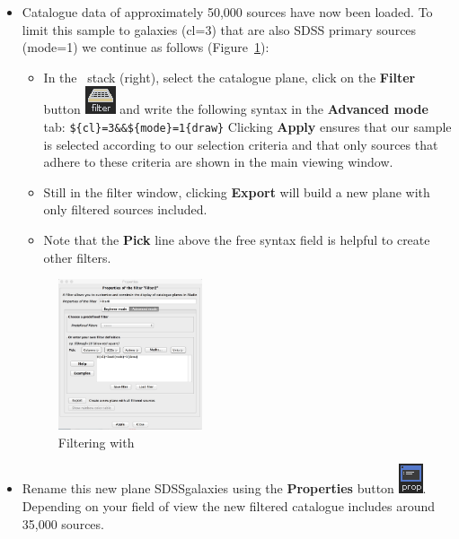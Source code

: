 \documentclass [a4paper, 12pt]{article}
\begin{document}
\begin{itemize}
\item Catalogue data of approximately 50,000 sources have now been loaded. To
limit this sample to galaxies (cl=3) that are also SDSS primary sources
(mode=1) we continue as follows (Figure~\ref{fig:aladinfilter}):
\begin{itemize}
    \item In the \aladin\ stack (right), select the catalogue plane, click on
    the \textbf{Filter} button  \includegraphics[width=0.04
    \textwidth]{../images/aladin_button_filter.png} and write the following
    syntax in the \textbf{Advanced mode} tab: \newline
    \texttt{\$\{cl\}=3\&\&\$\{mode\}=1\{draw\}} \newline
    Clicking \textbf{Apply} ensures that our sample is selected according to
    our selection criteria and that only sources that adhere to these criteria
    are shown in the main viewing window.
    \item Still in the filter window, clicking \textbf{Export} will build a new
    plane with only filtered sources included.
    \item Note that the \textbf{Pick} line above the free syntax field is
    helpful to create other filters.
\end{itemize}

\begin{figure}[H]
\center
\includegraphics[width=0.4\textwidth]{../images/aladin_filter_galaxies-sdss.jpg}
\caption{Filtering with \aladin}
\label{fig:aladinfilter}
\end{figure}

\item Rename this new plane SDSSgalaxies using the \textbf{Properties} button
\includegraphics[width=0.03
\textwidth]{../images/aladin_button_properties.png}. Depending on your field of
view the new filtered catalogue includes around 35,000 sources.


\end{itemize}
\end{document}
